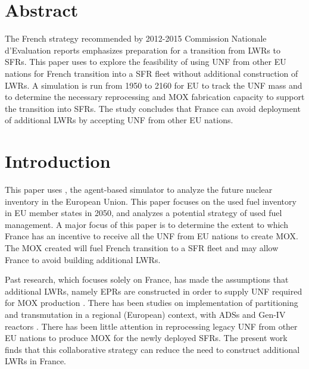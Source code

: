 \section{Abstract}
The French strategy recommended by 2012-2015 Commission Nationale d'Evaluation reports
\cite{noauthor_cne2_nodate} emphasizes preparation for a transition from \glspl{LWR} to \glspl{SFR}.
This paper uses \Cyclus to explore the feasibility of using \gls{UNF} from other EU nations
for French transition into a \gls{SFR} fleet without additional construction of \glspl{LWR}.
A \Cyclus simulation is run from 1950 to 2160 for EU to track the \gls{UNF} mass
and to determine the necessary reprocessing and \gls{MOX} fabrication capacity to support
the transition into \glspl{SFR}. The study concludes that France can avoid deployment
of additional \glspl{LWR} by accepting \gls{UNF} from other EU nations.


\section{Introduction}
This paper uses \Cyclus, the agent-based simulator \cite{huff_fundamental_2016} to analyze
the future nuclear inventory in the European Union. This paper focuses on the used fuel
inventory in \gls{EU} member states in 2050, and analyzes a potential strategy of used fuel
management.
A major focus of this paper is to determine the extent to which France has an incentive
to receive all the \gls{UNF} from \gls{EU} nations to create \gls{MOX}.
The \gls{MOX} created will fuel French transition to a \gls{SFR} fleet
and may allow France to avoid building additional \glspl{LWR}.

Past research, which focuses solely on France, has made the assumptions that additional \glspl{LWR},
namely \glspl{EPR} are constructed in order to supply \gls{UNF} required
for \gls{MOX} production \cite{carre_overview_2009, martin_symbiotic_2017, freynet_multiobjective_2016}.
There has been studies on implementation of partitioning and transmutation
in a regional (European) context, with \glspl{ADS} and Gen-IV reactors \cite{fazio_study_2013}.
There has been little attention in reprocessing legacy \gls{UNF} from other
EU nations to produce \gls{MOX} for the newly deployed \glspl{SFR}.
The present work finds that this collaborative strategy can reduce the
need to construct additional \glspl{LWR} in France.

